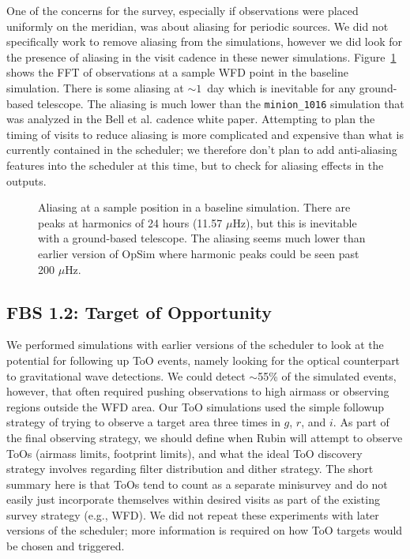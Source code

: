 One of the concerns for the survey, especially if observations were placed uniformly on the meridian, was about aliasing for periodic sources. We did not specifically work to remove aliasing from the simulations, however we did look for the presence of aliasing in the visit cadence in these newer simulations.  Figure~\ref{fig:alias} shows the FFT of observations at a sample WFD point in the baseline simulation. There is some aliasing at $\sim1$\ day which is inevitable for any ground-based telescope.  The aliasing is much lower than the {\tt minion\_1016} simulation that was analyzed in the Bell et al. cadence white paper. Attempting to plan the timing of visits to reduce aliasing is more complicated and expensive than what is currently contained in the scheduler; we therefore don't plan to add anti-aliasing features into the scheduler at this time, but to check for aliasing effects in the outputs.

\begin{figure}
\label{fig:alias}
\caption{Aliasing at a sample position in a baseline simulation. There are peaks at harmonics of 24 hours (11.57 $\mu$Hz), but this is inevitable with a ground-based telescope. The aliasing seems much lower than earlier version of OpSim where harmonic peaks could be seen past 200 $\mu$Hz.}\label{fig:alias}
\end{figure}


\subsection{FBS 1.2: Target of Opportunity}\label{ss:too}

We performed simulations with earlier versions of the scheduler to look at the potential for following up ToO events, namely looking for the optical counterpart to gravitational wave detections.  We could detect $\sim$55\% of the simulated events, however, that often required pushing observations to high airmass or observing regions outside the WFD area. Our ToO simulations used the simple followup strategy of trying to observe a target area three times in $g$, $r$, and $i$. As part of the final observing strategy, we should define when Rubin will attempt to observe ToOs (airmass limits, footprint limits), and what the ideal ToO discovery strategy involves regarding filter distribution and dither strategy. The short summary here is that ToOs tend to count as a separate minisurvey and do not easily just incorporate themselves within desired visits as part of the existing survey strategy (e.g., WFD). We did not repeat these experiments with later versions of the scheduler; more information is required on how ToO targets would be chosen and triggered. 
